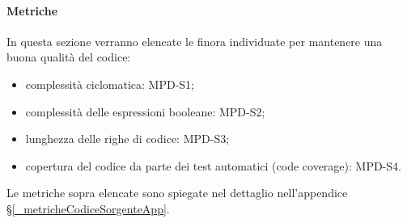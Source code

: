 \paragraph{Metriche}
\label{_metricheQualitaCodice}
In questa sezione verranno elencate le  finora individuate per mantenere una buona qualità del codice:
\begin{itemize}
  \item complessità ciclomatica: MPD-S1;
  \item complessità delle espressioni booleane: MPD-S2;
  \item lunghezza delle righe di codice: MPD-S3;
  \item copertura del codice da parte dei test automatici (code coverage): MPD-S4.
\end{itemize}

Le metriche sopra elencate sono spiegate nel dettaglio nell'appendice \S\ref{_metricheCodiceSorgenteApp}.
